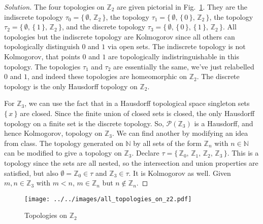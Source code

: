 \documentclass{article}
\theoremstyle{normal}
\begin{document}
    \color{black}
    \begin{proof}[Solution]
        The four topologies on $\mathbb{Z}_{2}$ are given pictorial in
        Fig.~\ref{fig:all_topologies_on_z2}. They are the indiscrete topology
        $\tau_{0}=\big\{\,\emptyset,\,\mathbb{Z}_{2}\,\big\}$, the topology
        $\tau_{1}=\big\{\,\emptyset,\,\{\,0\,\},\,\mathbb{Z}_{2}\,\big\}$,
        the topology
        $\tau_{2}=\big\{\,\emptyset,\,\{\,1\,\},\,\mathbb{Z}_{2}\,\big\}$,
        and the discrete topology
        $\tau_{3}=\big\{\,\emptyset,\,\{\,0\,\},\,\{\,1\,\},\,\mathbb{Z}_{2}\,\big\}$.
        All topologies but the indiscrete topology are Kolmogorov since all
        others can topologically distinguish $0$ and $1$ via open sets. The
        indiscrete topology is not Kolmogorov, that points $0$ and $1$ are
        topologically indistringuishable in this topology. The topologies
        $\tau_{1}$ and $\tau_{2}$ are essentially the same, we've just
        relabelled $0$ and $1$, and indeed these topologies are homeomorphic
        on $\mathbb{Z}_{2}$. The discrete topology is the only Hausdorff
        topology on $\mathbb{Z}_{2}$.
        \par\hfill\par
        For $\mathbb{Z}_{3}$, we can use the fact that in a Hausdorff
        topological space singleton sets $\{\,x\,\}$ are closed. Since the
        finite union of closed sets is closed, the only Hausdorff topology on
        a finite set is the discrete topology. So,
        $\mathcal{P}(\mathbb{Z}_{3})$ is a Hausdorff, and hence Kolmogorov,
        topology on $\mathbb{Z}_{3}$. We can find another by modifying an
        idea from class. The topology generated on $\mathbb{N}$ by all sets of
        the form $\mathbb{Z}_{n}$ with $n\in\mathbb{N}$ can be modified to
        give a topology on $\mathbb{Z}_{3}$. Declare
        $\tau=\{\,\mathbb{Z}_{0},\,\mathbb{Z}_{1},\,\mathbb{Z}_{2},\,\mathbb{Z}_{3}\,\}$.
        This is a topology since the sets are all nested, so the intersection
        and union properties are satisfied, but also
        $\emptyset=\mathbb{Z}_{0}\in\tau$ and $\mathbb{Z}_{3}\in\tau$. It is
        Kolmogorov as well. Given $m,n\in\mathbb{Z}_{3}$ with
        $m<n$, $m\in\mathbb{Z}_{n}$ but $n\notin\mathbb{Z}_{n}$. 
    \end{proof}
    \begin{figure}
        \centering
        \texttt{[image: ../../images/all\_topologies\_on\_z2.pdf]}
        \caption{Topologies on $\mathbb{Z}_{2}$}
        \label{fig:all_topologies_on_z2}
    \end{figure}
\end{document}
